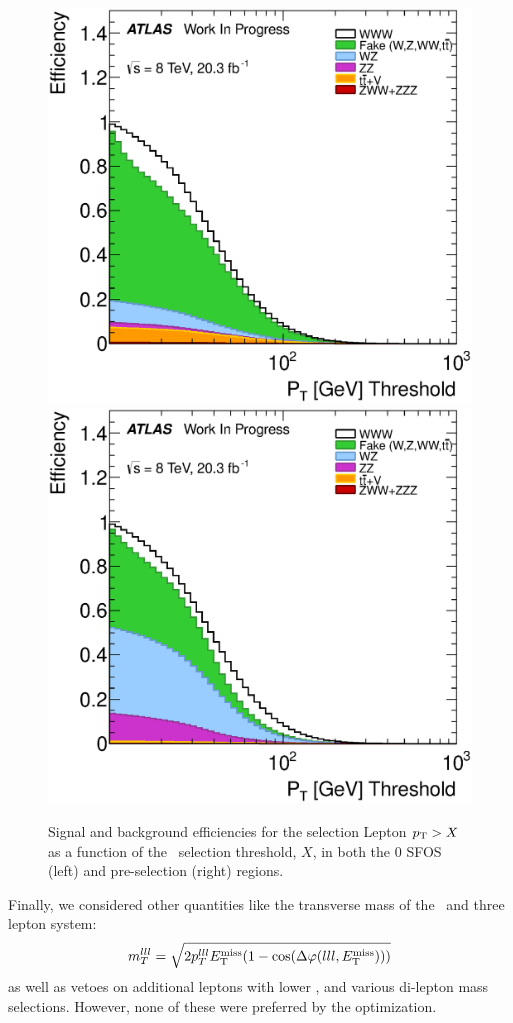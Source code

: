 \begin{figure}[ht!]
\centering
\includegraphics[width=0.45\columnwidth]{figures/optimization/SignalRegionsPreselection_0SFOS_Efficiencies/AllLeptonPt_Cumulative.eps}
\includegraphics[width=0.45\columnwidth]{figures/optimization/SignalRegions_0p5mmZ0_Preselection_Efficiencies/AllLeptonPt_Cumulative.eps}
\caption{ Signal and background efficiencies 
for the selection
Lepton $p_{\mathrm{T}} > X$
as a function of the \pt~selection
threshold, $X$, in both the 0 SFOS (left) and pre-selection (right) regions.  }
\label{fig:pt_eff}
\end{figure}

Finally, we considered other quantities like the 
transverse mass of the \MET~and three lepton system:
\begin{equation}
m_{T}^{lll} = \sqrt{2p_{T}^{lll}E_{\mathrm{T}}^{\mathrm{miss}}(1-\cos(\Delta\varphi(lll,E_{\mathrm{T}}^{\mathrm{miss}})))}
\end{equation}
as well as vetoes on additional leptons with lower \pt, and various
di-lepton mass selections.  However, none of these were preferred
by the optimization.



